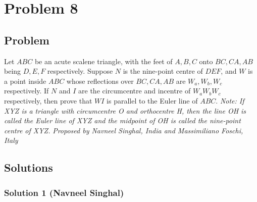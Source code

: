 \newcommand{\dangle}{\measuredangle}
\section{Problem 8}
\subsection{Problem}
Let $ABC$ be an acute scalene triangle, with the feet of $A, B, C$ onto $BC, CA, AB$ being $D, E, F$ respectively. Suppose $N$ is the nine-point centre of $DEF$, and $W$ is a point inside $ABC$ whose reflections over $BC, CA, AB$ are $W_a, W_b, W_c$ respectively. If $N$ and $I$ are the circumcentre and incentre of $W_aW_bW_c$ respectively, then prove that $WI$ is parallel to the Euler line of $ABC$.\nl
\emph{Note: If XYZ is a triangle with circumcentre O and orthocentre H, then the line OH is called the Euler line of XYZ and the midpoint of OH is called the nine-point centre of XYZ.}\nl
\textit{Proposed by Navneel Singhal, India and Massimiliano Foschi, Italy}

\subsection{Solutions}
\subsubsection{Solution 1 (Navneel Singhal)}

